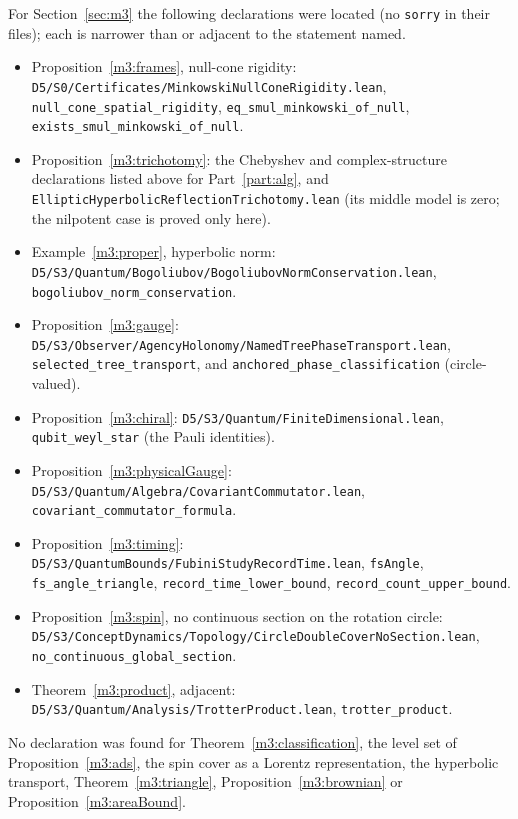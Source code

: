 \documentclass[11pt,reqno]{amsart}
\theoremstyle{definition}
\theoremstyle{remark}
\numberwithin{equation}{section}
\begin{document}
For Section~\ref{sec:m3} the following declarations were located (no \texttt{sorry} in their files); each is narrower than or adjacent
to the statement named.
{\small\raggedright
\begin{itemize}[leftmargin=1.5em]
\item Proposition~\ref{m3:frames}, null-cone rigidity: \texttt{D5/S0/Certificates/MinkowskiNullConeRigidity.lean},
\texttt{null\_cone\_spatial\_rigidity}, \texttt{eq\_smul\_minkowski\_of\_null}, \texttt{exists\_smul\_minkowski\_of\_null}.
\item Proposition~\ref{m3:trichotomy}: the Chebyshev and complex-structure declarations listed above for Part~\ref{part:alg}, and
\texttt{EllipticHyperbolicReflectionTrichotomy.lean} (its middle model is zero; the nilpotent case is proved only here).
\item Example~\ref{m3:proper}, hyperbolic norm: \texttt{D5/S3/Quantum/Bogoliubov/BogoliubovNormConservation.lean},
\texttt{bogoliubov\_norm\_conservation}.
\item Proposition~\ref{m3:gauge}: \texttt{D5/S3/Observer/AgencyHolonomy/NamedTreePhaseTransport.lean}, \texttt{selected\_tree\_transport},
and \texttt{anchored\_phase\_classification} (circle-valued).
\item Proposition~\ref{m3:chiral}: \texttt{D5/S3/Quantum/FiniteDimensional.lean}, \texttt{qubit\_weyl\_star} (the Pauli identities).
\item Proposition~\ref{m3:physicalGauge}: \texttt{D5/S3/Quantum/Algebra/CovariantCommutator.lean}, \texttt{covariant\_commutator\_formula}.
\item Proposition~\ref{m3:timing}: \texttt{D5/S3/QuantumBounds/FubiniStudyRecordTime.lean}, \texttt{fsAngle}, \texttt{fs\_angle\_triangle},
\texttt{record\_time\_lower\_bound}, \texttt{record\_count\_upper\_bound}.
\item Proposition~\ref{m3:spin}, no continuous section on the rotation circle:
\texttt{D5/S3/ConceptDynamics/Topology/CircleDoubleCoverNoSection.lean}, \texttt{no\_continuous\_global\_section}.
\item Theorem~\ref{m3:product}, adjacent: \texttt{D5/S3/Quantum/Analysis/TrotterProduct.lean}, \texttt{trotter\_product}.
\end{itemize}}
No declaration was found for Theorem~\ref{m3:classification}, the level set of Proposition~\ref{m3:ads}, the spin cover as a Lorentz
representation, the hyperbolic transport, Theorem~\ref{m3:triangle}, Proposition~\ref{m3:brownian} or Proposition~\ref{m3:areaBound}.
\end{document}
